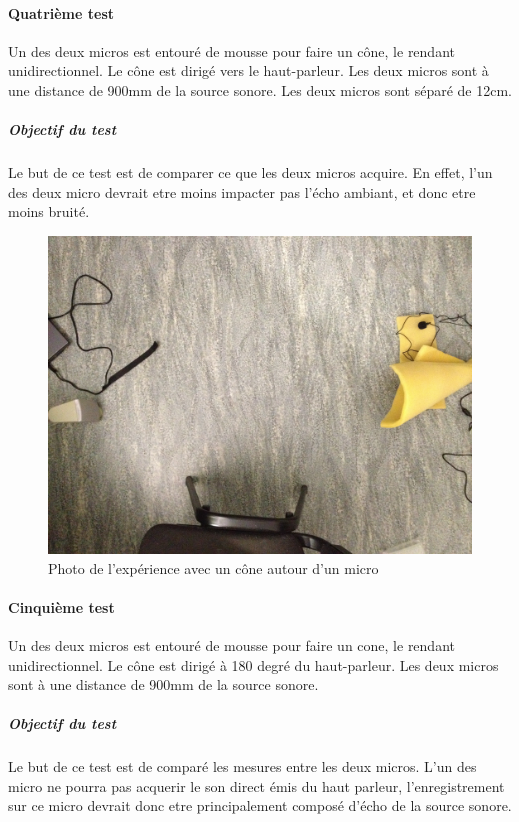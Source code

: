 \documentclass[12pt,a4paper]{report}
\begin{document}
 \paragraph{Quatrième test} 
 Un des deux micros est entouré de mousse pour faire un cône, le rendant unidirectionnel. Le cône est dirigé vers le haut-parleur. Les deux micros sont à une distance de 900mm de la source sonore. Les deux micros sont séparé de 12cm.
 \subparagraph{Objectif du test}
 Le but de ce test est de comparer ce que les deux micros acquire. En effet, l'un des deux micro devrait etre moins impacter pas l'écho ambiant, et donc etre moins bruité.
 \begin{figure}[H]
 \includegraphics[width=\textwidth]{../tests/lecture_de_signaux_carres/donnees11-03/test_4.jpg} 
 \caption{Photo de l'expérience avec un cône autour d'un micro}
 \end{figure}
 	
 \paragraph{Cinquième test} 
 Un des deux micros est entouré de mousse pour faire un cone, le rendant unidirectionnel. Le cône est dirigé à 180 degré du haut-parleur. Les deux micros sont à une distance de 900mm de la source sonore.
 \subparagraph{Objectif du test}
 Le but de ce test est de comparé les mesures entre les deux micros. L'un des micro ne pourra pas acquerir le son direct émis du haut parleur, l'enregistrement sur ce micro devrait donc etre principalement composé d'écho de la source sonore.
 
\end{document}
